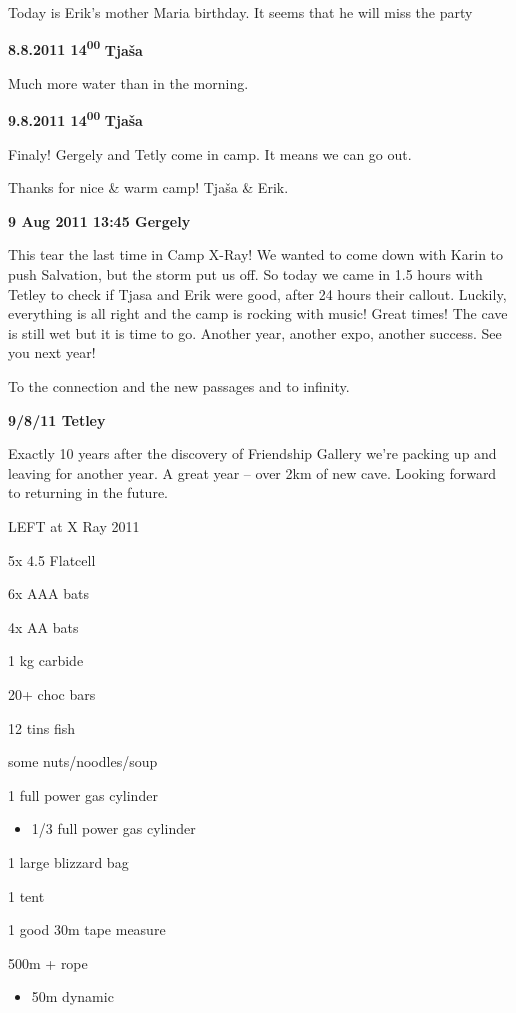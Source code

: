 Today is Erik's mother Maria birthday. It seems that he will miss the
party

\textbf{8.8.2011 14\textsuperscript{00}} \textbf{Tjaša}

Much more water than in the morning.

\textbf{9.8.2011 14\textsuperscript{00}} \textbf{Tjaša}

Finaly! Gergely and Tetly come in camp. It means we can go out.

Thanks for nice \& warm camp! Tjaša \& Erik.

\textbf{9 Aug 2011 13:45 Gergely}

This tear the last time in Camp X-Ray! We wanted to come down with Karin
to push Salvation, but the storm put us off. So today we came in 1.5
hours with Tetley to check if Tjasa and Erik were good, after 24 hours
their callout. Luckily, everything is all right and the camp is rocking
with music! Great times! The cave is still wet but it is time to go.
Another year, another expo, another success. See you next year!

To the connection and the new passages and to infinity.

\textbf{9/8/11 Tetley}

Exactly 10 years after the discovery of Friendship Gallery we're packing
up and leaving for another year. A great year -- over 2km of new cave.
Looking forward to returning in the future.

LEFT at X Ray 2011

5x 4.5 Flatcell

6x AAA bats

4x AA bats

1 kg carbide

20+ choc bars

12 tins fish

some nuts/noodles/soup

1 full power gas cylinder

\begin{itemize}
\tightlist
\item
  1/3 full power gas cylinder
\end{itemize}

1 large blizzard bag

1 tent

1 good 30m tape measure

500m + rope

\begin{itemize}
\tightlist
\item
  50m dynamic
\end{itemize}

